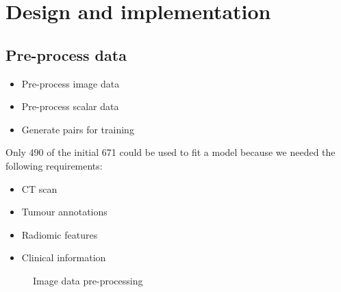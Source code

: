 
\section{Design and implementation}

\subsection{Pre-process data}
\begin{frame}{\insertsubsec}
  \begin{itemize}
    \item Pre-process image data
    \item Pre-process scalar data
    \item Generate pairs for training
  \end{itemize}

  \vspace{.5cm}
  Only 490 of the initial 671 could be used to fit a model because we needed the following 
  requirements:
  \begin{itemize}
    \item CT scan
    \item Tumour annotations
    \item Radiomic features
    \item Clinical information
  \end{itemize}
\end{frame}
\begin{frame}
  \begin{figure}
    \centering
    \scalebox{.6}{}
    \caption{Image data pre-processing}
  \end{figure}
\end{frame}